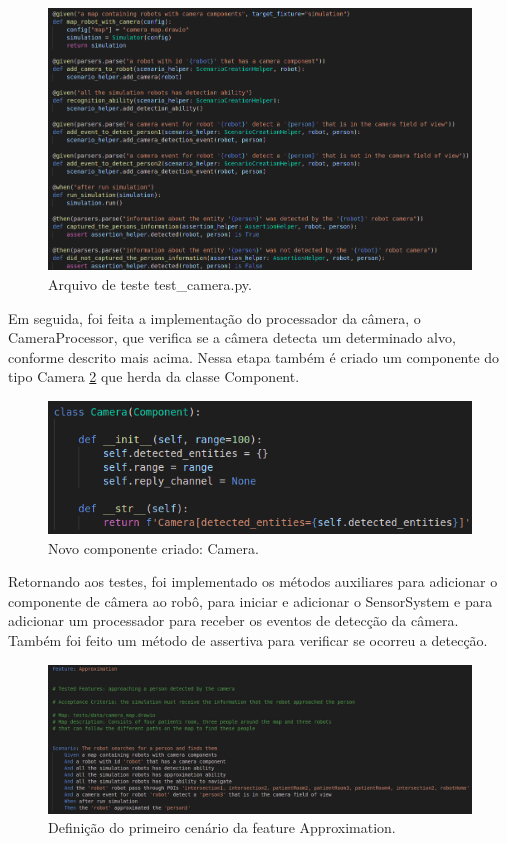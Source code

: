 \begin{figure}
\centering
\includegraphics[width=\textwidth]{imagens/testCamera.png}
\caption{Arquivo de teste test\_camera.py.} 
\label{fig:testCamera}
\end{figure}

Em seguida, foi feita a implementação do processador da câmera, o CameraProcessor, que verifica se a câmera detecta um determinado alvo, conforme descrito mais acima. Nessa etapa também é criado um componente do tipo Camera \ref{fig:cameraComp} que herda da classe Component.

\begin{figure}
\centering
\includegraphics[scale=0.5]{imagens/cameraComp.png}
\caption{Novo componente criado: Camera.} 
\label{fig:cameraComp}
\end{figure}

Retornando aos testes, foi implementado os métodos auxiliares para adicionar o componente de câmera ao robô, para iniciar e adicionar o SensorSystem e para adicionar um processador para receber os eventos de detecção da câmera. Também foi feito um método de assertiva para verificar se ocorreu a detecção.

\begin{figure}
\centering
\includegraphics[width=\textwidth]{imagens/approxFeat.png}
\caption{Definição do primeiro cenário da feature Approximation.} 
\label{fig:approxFeat}
\end{figure}

